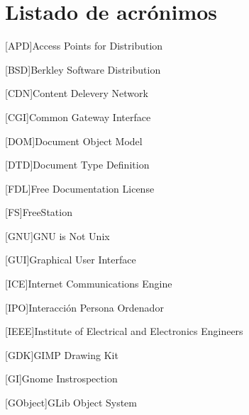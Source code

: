 
\chapter*{Listado de acrónimos} 




{
	\begin{acronym}[XXXXXXXX]

        [APD]{Access Points for Distribution}
        
        [BSD]{Berkley Software Distribution}
        
        [CDN]{Content Delevery Network}
        
        [CGI]{Common Gateway Interface}
        
        [DOM]{Document Object Model}
        
        [DTD]{Document Type Definition}
        
        [FDL]{Free Documentation License}
        
		[FS]{FreeStation}
		
		
		[GNU]{GNU is Not Unix}
		
		[GUI]{Graphical User Interface}
		
		[ICE]{Internet Communications Engine}
		
		[IPO]{Interacción Persona Ordenador}
		
		{Institute of Electrical and Electronics Engineers}
		
		[GDK]{GIMP Drawing Kit}
		
		[GI]{Gnome Instrospection}
		
		[GObject]{GLib Object System}
		

\end{acronym}}
